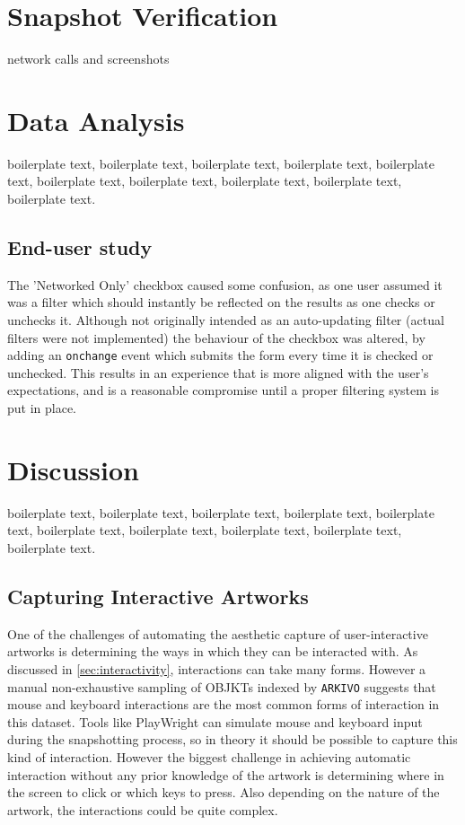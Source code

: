\section{Snapshot Verification}

\todo network calls and screenshots


\section{Data Analysis}

boilerplate text, boilerplate text, boilerplate text, boilerplate text, boilerplate text, boilerplate text, boilerplate text, boilerplate text, boilerplate text, boilerplate text.

\subsection{End-user study}


The 'Networked Only' checkbox caused some confusion, as one user assumed it was a filter which should instantly be reflected on the results as one checks or unchecks it. Although not originally intended as an auto-updating filter (actual filters were not implemented) the behaviour of the checkbox was altered, by adding an \texttt{onchange} event which submits the form every time it is checked or unchecked. This results in an experience that is more aligned with the user's expectations, and is a reasonable compromise until a proper filtering system is put in place.




\section{Discussion}


boilerplate text, boilerplate text, boilerplate text, boilerplate text, boilerplate text, boilerplate text, boilerplate text, boilerplate text, boilerplate text, boilerplate text.


\subsection{Capturing Interactive Artworks}
\label{subsec:capture-interactive}

One of the challenges of automating the aesthetic capture of user-interactive artworks is determining the ways in which they can be interacted with. As discussed in \autoref{sec:interactivity}, interactions can take many forms. However a manual non-exhaustive sampling of OBJKTs indexed by \texttt{ARKIVO} suggests that mouse and keyboard interactions are the most common forms of interaction in this dataset. Tools like PlayWright can simulate mouse and keyboard input during the snapshotting process, so in theory it should be possible to capture this kind of interaction. However the biggest challenge in achieving automatic interaction without any prior knowledge of the artwork is determining where in the screen to click or which keys to press. Also depending on the nature of the artwork, the interactions could be quite complex.

